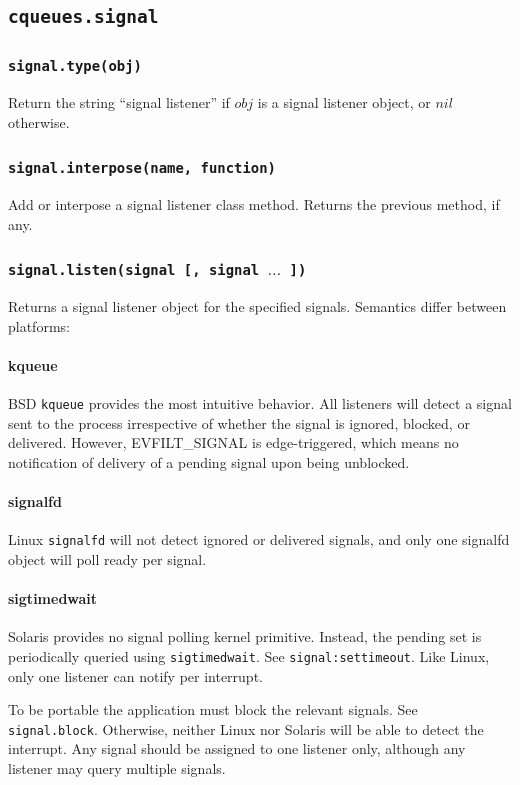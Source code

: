 \documentclass[11pt, oneside]{memoir}
\newcommand*{\syscall}[1]{\texttt{#1}\xspace}
\newcommand*{\routine}[1]{\texttt{#1}\xspace}
\newcommand*{\fn}[1]{\texttt{#1}\xspace}
\newcommand*{\method}[1]{\texttt{#1}\xspace}
\newcounter{toccols}
\newenvironment{Module}[1]{
	\subsection{\texttt{#1}}
	\addtocontents{toc}{
		\protect\begin{multicols}{\value{toccols}}
	}
}{
	\addtocontents{toc}{\protect\end{multicols}}
}
\begin{document}
\begin{Module}{cqueues.signal}
\subsubsection[\routine{signal.type}]{\routine{signal.type(obj)}}
Return the string ``signal listener'' if $obj$ is a signal listener object, or $nil$ otherwise.

\subsubsection[\fn{signal.interpose}]{\fn{signal.interpose(name, function)}}
Add or interpose a signal listener class method. Returns the previous method, if any.

\subsubsection[\fn{signal.listen}]{\fn{signal.listen(signal [, signal $\ldots$ ])}}
Returns a signal listener object for the specified signals. Semantics differ between platforms:

\paragraph{kqueue}
BSD \syscall{kqueue} provides the most intuitive behavior. All listeners will detect a signal sent to the process irrespective of whether the signal is ignored, blocked, or delivered. However, EVFILT\_SIGNAL is edge-triggered, which means no notification of delivery of a pending signal upon being unblocked.

\paragraph{signalfd}
Linux \syscall{signalfd} will not detect ignored or delivered signals, and only one signalfd object will poll ready per signal.

\paragraph{sigtimedwait}
Solaris provides no signal polling kernel primitive. Instead, the pending set is periodically queried using \syscall{sigtimedwait}. See \method{signal:settimeout}. Like Linux, only one listener can notify per interrupt.

To be portable the application must block the relevant signals. See \fn{signal.block}. Otherwise, neither Linux nor Solaris will be able to detect the interrupt. Any signal should be assigned to one listener only, although any listener may query multiple signals.


\end{Module}
\end{document}
